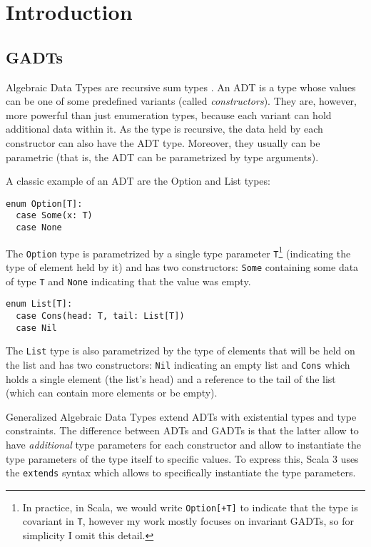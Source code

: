 \chapter{Introduction}

\section{GADTs}

Algebraic Data Types are recursive sum types \cite{?}. An ADT is a type whose values can be one of some predefined variants (called \textit{constructors}). They are, however, more powerful than just enumeration types, because each variant can hold additional data within it. As the type is recursive, the data held by each constructor can also have the ADT type. Moreover, they usually can be parametric (that is, the ADT can be parametrized by type arguments).

A classic example of an ADT are the Option and List types:

\begin{verbatim}
enum Option[T]:
  case Some(x: T)
  case None
\end{verbatim}

The \texttt{Option} type is parametrized by a single type parameter \texttt{T}\footnote{In practice, in Scala, we would write \texttt{Option[+T]} to indicate that the type is covariant in \texttt{T}, however my work mostly focuses on invariant GADTs, so for simplicity I omit this detail.} (indicating the type of element held by it) and has two constructors: \texttt{Some} containing some data of type \texttt{T} and \texttt{None} indicating that the value was empty.

\begin{verbatim}
enum List[T]:
  case Cons(head: T, tail: List[T])
  case Nil
\end{verbatim}

The \texttt{List} type is also parametrized by the type of elements that will be held on the list and has two constructors: \texttt{Nil} indicating an empty list and \texttt{Cons} which holds a single element (the list's head) and a reference to the tail of the list (which can contain more elements or be empty).

Generalized Algebraic Data Types extend ADTs with existential types and type constraints. The difference between ADTs and GADTs is that the latter allow to have \textit{additional} type parameters for each constructor and allow to instantiate the type parameters of the type itself to specific values. To express this, Scala 3 uses the \texttt{extends} syntax which allows to specifically instantiate the type parameters.

